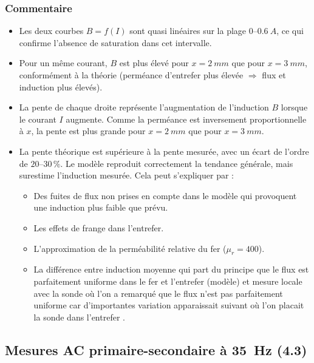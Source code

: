 \subsubsection{Commentaire}
\begin{itemize}
\item Les deux courbes \(B=f(I)\) sont quasi linéaires sur la plage \(0\)–\(\SI{0.6}{A}\), ce qui confirme l'absence de saturation dans cet intervalle.

\item Pour un même courant, \(B\) est plus élevé pour \(x=\SI{2}{mm}\) que pour \(x=\SI{3}{mm}\), conformément à la théorie (perméance d'entrefer plus élevée $\Rightarrow$ flux et induction plus élevés).

\item La pente de chaque droite représente l'augmentation de l'induction \(B\) lorsque le courant \(I\) augmente. Comme la perméance est inversement proportionnelle à \(x\), la pente est plus grande pour \(x=\SI{2}{mm}\) que pour \(x=\SI{3}{mm}\).

\item La pente théorique est supérieure à la pente mesurée, avec un écart de l'ordre de \(20\)–\(30\,\%\). Le modèle reproduit correctement la tendance générale, mais surestime l'induction mesurée. Cela peut s'expliquer par :
\begin{itemize}
    \item Des fuites de flux non prises en compte dans le modèle qui provoquent une induction plus faible que prévu.
    \item Les effets de frange dans l’entrefer.
    \item L’approximation de la perméabilité relative du fer (\(\mu_r = 400\)).
    \item La différence entre induction moyenne qui part du principe que le flux est parfaitement uniforme dans le fer et l'entrefer (modèle) et mesure locale avec la sonde où l'on a remarqué que le flux n'est pas parfaitement uniforme car d'importantes variation apparaissait suivant où l'on placait la sonde dans l'entrefer .
\end{itemize}

\end{itemize}

\newpage
\subsection{Mesures AC primaire-secondaire à \SI{35}{Hz} (4.3)}

